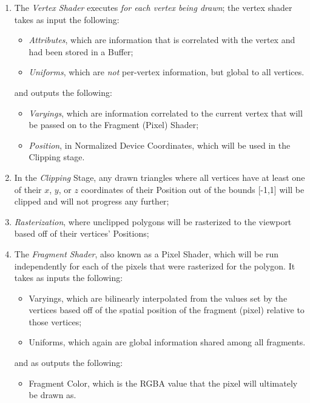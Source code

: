 \begin{enumerate}
    \item The \emph{Vertex Shader} executes \emph{for each vertex being drawn}; the vertex shader takes as input the following:
    \begin{itemize}
        \item \emph{Attributes}, which are information that is correlated with the vertex and had been stored in a Buffer;
        \item \emph{Uniforms}, which are \emph{not} per-vertex information, but global to all vertices.
    \end{itemize}
    and outputs the following:
    \begin{itemize}
        \item \emph{Varyings}, which are information correlated to the current vertex that will be passed on to the Fragment (Pixel) Shader;
        \item \emph{Position}, in Normalized Device Coordinates, which will be used in the Clipping stage.
    \end{itemize}
    \item In the \emph{Clipping} Stage, any drawn triangles where all vertices have at least one of their $x$, $y$, or $z$ coordinates of their Position out of the bounds [-1,1] will be clipped and will not progress any further;
    \item \emph{Rasterization}, where unclipped polygons will be rasterized to the viewport based off of their vertices' Positions;
    \item The \emph{Fragment Shader}, also known as a Pixel Shader, which will be run independently for each of the pixels that were rasterized for the polygon. It takes as inputs the following:
    \begin{itemize}
        \item Varyings, which are bilinearly interpolated from the values set by the vertices based off of the spatial position of the fragment (pixel) relative to those vertices;
        \item Uniforms, which again are global information shared among all fragments.
    \end{itemize}
    and as outputs the following:
    \begin{itemize}
        \item Fragment Color, which is the RGBA value that the pixel will ultimately be drawn as.
    \end{itemize}
\end{enumerate}

